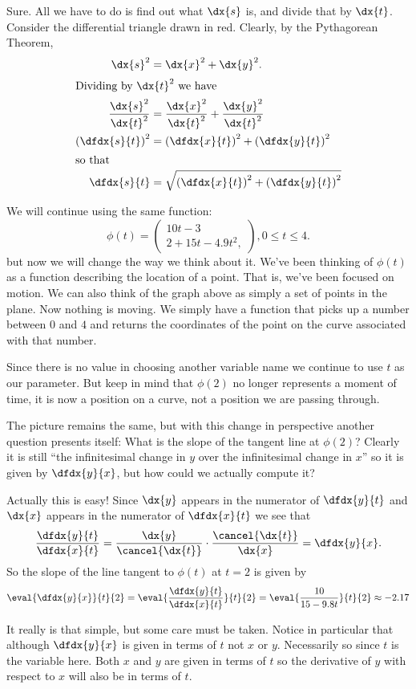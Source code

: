 \begin{myexample}
  Sure. All we have to do is find out what $\dx{s}$ is, and divide
  that by $\dx{t}$.  Consider the differential triangle drawn in
  red. Clearly, by the Pythagorean Theorem,
  \begin{align*}
    \dx{s}^2&=\dx{x}^2+\dx{y}^2.\\
    \intertext{Dividing by $\dx{t}^2$ we have}
    \frac{\dx{s}^2}{\dx{t}^2}&=\frac{\dx{x}^2}{\dx{t}^2}+\frac{\dx{y}^2}{\dx{t}^2}\\
    \left(\dfdx{s}{t}\right)^2&=\left(\dfdx{x}{t}\right)^2+\left(\dfdx{y}{t}\right)^2\\
    \intertext{so that}
    \dfdx{s}{t}&=\sqrt{\left(\dfdx{x}{t}\right)^2+\left(\dfdx{y}{t}\right)^2}
  \end{align*}
\end{myexample}

\begin{myexample}
  We will continue using the same function:
  $$
  \phi(t) =
  \begin{pmatrix}
    10t-3\\     
    2 + 15t-4.9t^2,
  \end{pmatrix}, 0\le t \le 4.
  $$
  but now we will change the way we think about it.  We've been
  thinking of $\phi(t)$ as a function describing the location of a
  point. That is, we've been focused on motion. We can also think of
  the graph above as simply a set of points in the plane. Now nothing
  is moving. We simply have a function that picks up a number between
  $0$ and $4$ and returns the coordinates of the point on the curve
  associated with that number.

  Since there is no value in choosing another variable name we
  continue to use $t$ as our parameter. But keep in mind that
  $\phi(2)$ no longer represents a moment of time, it is now a
  position on a  curve, not a position we are passing through.

  The picture
  remains the same, but with this change in perspective another
  question presents itself: What is the slope of the tangent line at
  $\phi(2)$?
  Clearly it is still ``the infinitesimal change in $y$ over the
  infinitesimal change in $x$'' so it is given by
  $\dfdx{y}{x}$, but how could we actually compute it?

  Actually this is easy! Since $\dx{y}$ appears in the numerator of $\dfdx{y}{t}$ and
  $\dx{x}$ appears in the numerator of $\dfdx{x}{t}$ we see that
  $$
  \frac{\dfdx{y}{t}}{\dfdx{x}{t}} =
  \frac{\dx{y}}{\cancel{\dx{t}}}\cdot\frac{\cancel{\dx{t}}}{\dx{x}}
  =\dfdx{y}{x}.
  $$
  So the slope of the line tangent to $\phi(t)$ at $t=2$ is given by
  $$
  \eval{\dfdx{y}{x}}{t}{2}
  =\eval{\frac{\dfdx{y}{t}}{\dfdx{x}{t}}}{t}{2} =
  \eval{\frac{10}{15-9.8t}}{t}{2} \approx
  -2.17
  $$
  
  It really is that simple, but some care must be taken. Notice in
  particular that although $\dfdx{y}{x}$ is given in terms of $t$ not
  $x$ or $y$. Necessarily so since $t$ is the variable here. Both $x$
  and $y$ are given in terms of $t$ so  the derivative of
  $y$ with respect to $x$ will also be in terms of $t$.
\end{myexample}

